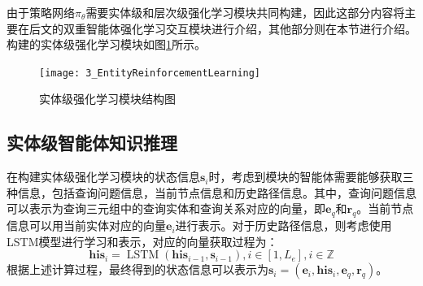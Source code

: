 \documentclass[algorithmlist, AutoFakeBold, AutoFakeSlant, figurelist, tablelist, nomlist, engineering]{seuthesix}
\begin{document}
由于策略网络$\pi_\theta$需要实体级和层次级强化学习模块共同构建，因此这部分内容将主要在后文的双重智能体强化学习交互模块进行介绍，其他部分则在本节进行介绍。构建的实体级强化学习模块如图\ref{3_EntityReinforcementLearning}所示。
\begin{figure}
  \centering
  \texttt{[image: 3\_EntityReinforcementLearning]}
  \caption{实体级强化学习模块结构图}
  \label{3_EntityReinforcementLearning}
\end{figure}

\subsection{实体级智能体知识推理}
在构建实体级强化学习模块的状态信息$\bm{s}_i$时，考虑到模块的智能体需要能够获取三种信息，包括查询问题信息，当前节点信息和历史路径信息。其中，查询问题信息可以表示为查询三元组中的查询实体和查询关系对应的向量，即$\bm{e}_q$和$\bm{r}_q$。当前节点信息可以用当前实体对应的向量$\bm{e}_i$进行表示。对于历史路径信息，则考虑使用LSTM模型进行学习和表示，对应的向量获取过程为：
\begin{equation}
  \bm{his}_i=\operatorname{LSTM}\left(\bm{his}_{i - 1}, \bm{s}_{i - 1}\right), i \in [1, L_e], i \in \mathbb{Z}
  \label{equation_HistoryLSTM}
\end{equation}
根据上述计算过程，最终得到的状态信息可以表示为$\bm{s}_i = (\bm{e}_i, \bm{his}_i, \bm{e}_q, \bm{r}_q)$。
\end{document}
